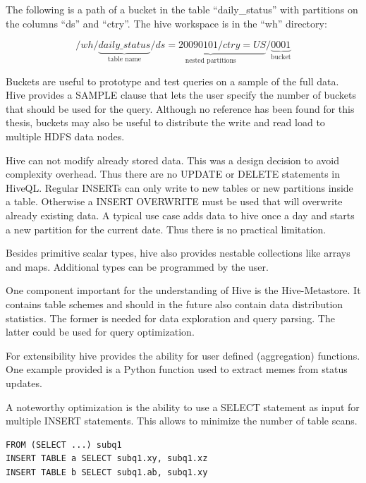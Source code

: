 \documentclass[12pt,a4paper]{scrartcl}		%
\begin{document}
The following is a path of a bucket in the table ``daily\_status'' with partitions on the columns ``ds'' and ``ctry''. The hive workspace is in the ``wh'' directory:

\begin{displaymath}
  /wh/\underbrace{daily\_status}_{\text{table name}}/\underbrace{ds=20090101/ctry=US}_{\text{nested partitions}}/\underbrace{0001}_{\text{bucket}}
\end{displaymath}

Buckets are useful to prototype and test queries on a sample of the full data. Hive provides a SAMPLE clause that lets the user specify the number of buckets that should be used for the query. Although no reference has been found for this thesis, buckets may also be useful to distribute the write and read load to multiple HDFS data nodes.

Hive can not modify already stored data. This was a design decision to avoid complexity overhead. Thus there are no UPDATE or DELETE statements in HiveQL.\cite{hive-icde2010} Regular INSERTs can only write to new tables or new partitions inside a table. Otherwise a INSERT OVERWRITE must be used that will overwrite already existing data. A typical use case adds data to hive once a day and starts a new partition for the current date. Thus there is no practical limitation.

Besides primitive scalar types, hive also provides nestable collections like arrays and maps. Additional types can be programmed by the user.

One component important for the understanding of Hive is the Hive-Metastore. It contains table schemes and should in the future also contain data distribution statistics. The former is needed for data exploration and query parsing. The latter could be used for query optimization.

For extensibility hive provides the ability for user defined (aggregation) functions. One example provided is a Python function used to extract memes from status updates.

A noteworthy optimization is the ability to use a SELECT statement as input for multiple INSERT statements. This allows to minimize the number of table scans.

\begin{verbatim}
FROM (SELECT ...) subq1
INSERT TABLE a SELECT subq1.xy, subq1.xz
INSERT TABLE b SELECT subq1.ab, subq1.xy
\end{verbatim}

\newpage{}
{}

\end{document}

